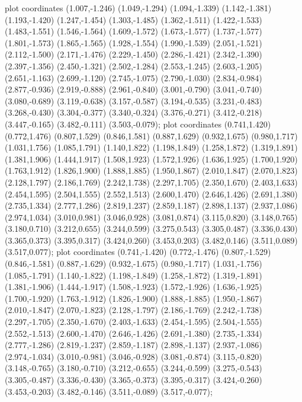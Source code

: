  plot coordinates {(1.007,-1.246) (1.049,-1.294) (1.094,-1.339) (1.142,-1.381) (1.193,-1.420) (1.247,-1.454) (1.303,-1.485) (1.362,-1.511) (1.422,-1.533) (1.483,-1.551) (1.546,-1.564) (1.609,-1.572) (1.673,-1.577) (1.737,-1.577) (1.801,-1.573) (1.865,-1.565) (1.928,-1.554) (1.990,-1.539) (2.051,-1.521) (2.112,-1.500) (2.171,-1.476) (2.229,-1.450) (2.286,-1.421) (2.342,-1.390) (2.397,-1.356) (2.450,-1.321) (2.502,-1.284) (2.553,-1.245) (2.603,-1.205) (2.651,-1.163) (2.699,-1.120) (2.745,-1.075) (2.790,-1.030) (2.834,-0.984) (2.877,-0.936) (2.919,-0.888) (2.961,-0.840) (3.001,-0.790) (3.041,-0.740) (3.080,-0.689) (3.119,-0.638) (3.157,-0.587) (3.194,-0.535) (3.231,-0.483) (3.268,-0.430) (3.304,-0.377) (3.340,-0.324) (3.376,-0.271) (3.412,-0.218) (3.447,-0.165) (3.482,-0.111) (3.503,-0.079)};
 plot coordinates {(0.741,1.420) (0.772,1.476) (0.807,1.529) (0.846,1.581) (0.887,1.629) (0.932,1.675) (0.980,1.717) (1.031,1.756) (1.085,1.791) (1.140,1.822) (1.198,1.849) (1.258,1.872) (1.319,1.891) (1.381,1.906) (1.444,1.917) (1.508,1.923) (1.572,1.926) (1.636,1.925) (1.700,1.920) (1.763,1.912) (1.826,1.900) (1.888,1.885) (1.950,1.867) (2.010,1.847) (2.070,1.823) (2.128,1.797) (2.186,1.769) (2.242,1.738) (2.297,1.705) (2.350,1.670) (2.403,1.633) (2.454,1.595) (2.504,1.555) (2.552,1.513) (2.600,1.470) (2.646,1.426) (2.691,1.380) (2.735,1.334) (2.777,1.286) (2.819,1.237) (2.859,1.187) (2.898,1.137) (2.937,1.086) (2.974,1.034) (3.010,0.981) (3.046,0.928) (3.081,0.874) (3.115,0.820) (3.148,0.765) (3.180,0.710) (3.212,0.655) (3.244,0.599) (3.275,0.543) (3.305,0.487) (3.336,0.430) (3.365,0.373) (3.395,0.317) (3.424,0.260) (3.453,0.203) (3.482,0.146) (3.511,0.089) (3.517,0.077)};
 plot coordinates {(0.741,-1.420) (0.772,-1.476) (0.807,-1.529) (0.846,-1.581) (0.887,-1.629) (0.932,-1.675) (0.980,-1.717) (1.031,-1.756) (1.085,-1.791) (1.140,-1.822) (1.198,-1.849) (1.258,-1.872) (1.319,-1.891) (1.381,-1.906) (1.444,-1.917) (1.508,-1.923) (1.572,-1.926) (1.636,-1.925) (1.700,-1.920) (1.763,-1.912) (1.826,-1.900) (1.888,-1.885) (1.950,-1.867) (2.010,-1.847) (2.070,-1.823) (2.128,-1.797) (2.186,-1.769) (2.242,-1.738) (2.297,-1.705) (2.350,-1.670) (2.403,-1.633) (2.454,-1.595) (2.504,-1.555) (2.552,-1.513) (2.600,-1.470) (2.646,-1.426) (2.691,-1.380) (2.735,-1.334) (2.777,-1.286) (2.819,-1.237) (2.859,-1.187) (2.898,-1.137) (2.937,-1.086) (2.974,-1.034) (3.010,-0.981) (3.046,-0.928) (3.081,-0.874) (3.115,-0.820) (3.148,-0.765) (3.180,-0.710) (3.212,-0.655) (3.244,-0.599) (3.275,-0.543) (3.305,-0.487) (3.336,-0.430) (3.365,-0.373) (3.395,-0.317) (3.424,-0.260) (3.453,-0.203) (3.482,-0.146) (3.511,-0.089) (3.517,-0.077)};
